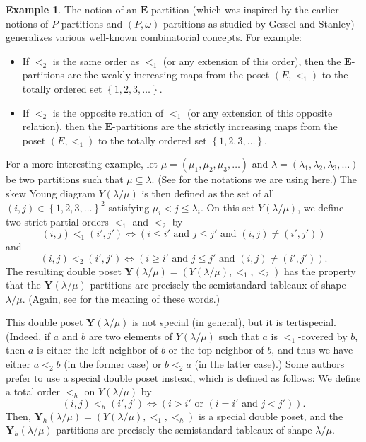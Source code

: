 \documentclass[12pt]{article}
\theoremstyle{plain}
\theoremstyle{definition}
\newtheorem{example}[theorem]{Example}
\theoremstyle{remark}
\newcommand{\EE}{{\mathbf{E}}}
\begin{document}
\begin{example}
\label{exam.dp}
The notion of an $\EE$-partition (which was inspired by the earlier
notions of $P$-partitions and $\left(P,\omega\right)$-partitions
as studied by Gessel and Stanley\footnotemark)
generalizes various well-known
combinatorial concepts. For example:
\begin{itemize}
\item If $<_2$ is the same order
as $<_1$ (or any extension of this order), then the
$\EE$-partitions are the weakly increasing maps from the poset
$\left(E, <_1\right)$ to the totally ordered set
$\left\{1, 2, 3, \ldots\right\}$.
\item If $<_2$ is the opposite relation of
$<_1$ (or any extension of this opposite relation), then the
$\EE$-partitions are the strictly increasing maps from the
poset $\left(E, <_1\right)$ to the totally ordered set
$\left\{1, 2, 3, \ldots\right\}$.
\end{itemize}

For a more interesting example,
let $\mu = \left(\mu_1, \mu_2, \mu_3, \ldots\right)$ and
$\lambda = \left(\lambda_1, \lambda_2, \lambda_3, \ldots\right)$ be
two partitions such that $\mu \subseteq \lambda$.
(See \cite[\S 2]{Reiner} for the notations we are using
here.)
The skew Young
diagram $Y\left(\lambda / \mu\right)$ is then defined as the set of all
$\left(i, j\right) \in \left\{ 1, 2, 3, \ldots \right\}^2$ satisfying
$\mu_i < j \leq \lambda_i$. On this set $Y\left(\lambda / \mu\right)$,
we define two strict partial orders $<_1$ and $<_2$ by
\[
\left(i,j\right) <_1 \left(i',j'\right) \Longleftrightarrow
\left( i \leq i' \text{ and } j \leq j' \text{ and }
\left(i,j\right) \neq \left(i',j'\right) \right)
\]
and
\[
\left(i,j\right) <_2 \left(i',j'\right) \Longleftrightarrow
\left( i \geq i' \text{ and } j \leq j' \text{ and }
\left(i,j\right) \neq \left(i',j'\right) \right) .
\]
The resulting double poset
$\mathbf{Y}\left(\lambda / \mu\right)
= \left(Y\left(\lambda / \mu\right), <_1, <_2\right)$ has the
property that the \newline
$\mathbf{Y}\left(\lambda / \mu\right)$-partitions
are precisely the semistandard tableaux of shape
$\lambda / \mu$. (Again, see \cite[\S 2]{Reiner} for the meaning
of these words.)

This double poset $\mathbf{Y}\left(\lambda / \mu\right)$
is not special (in general), but it is tertispecial. (Indeed,
if $a$ and $b$ are two elements of $Y\left(\lambda / \mu\right)$
such that $a$ is $<_1$-covered by $b$, then $a$ is either the left
neighbor of $b$ or the top neighbor of $b$, and thus we have
either $a <_2 b$ (in the former case) or $b <_2 a$ (in the latter
case).) Some authors prefer to use a special double poset instead,
which is defined as follows: We define a total
order $<_h$ on $Y\left(\lambda / \mu\right)$ by
\[
\left(i,j\right) <_h \left(i',j'\right) \Longleftrightarrow
\left( i > i' \text{ or } \left( i = i' \text{ and }
j < j' \right) \right) .
\]
Then, $\mathbf{Y}_h\left(\lambda / \mu\right)
= \left(Y\left(\lambda / \mu\right), <_1, <_h\right)$ is a special
double poset, and the
$\mathbf{Y}_h\left(\lambda / \mu\right)$-partitions
are precisely the semistandard tableaux of shape
$\lambda / \mu$.
\end{example}
\end{document}
